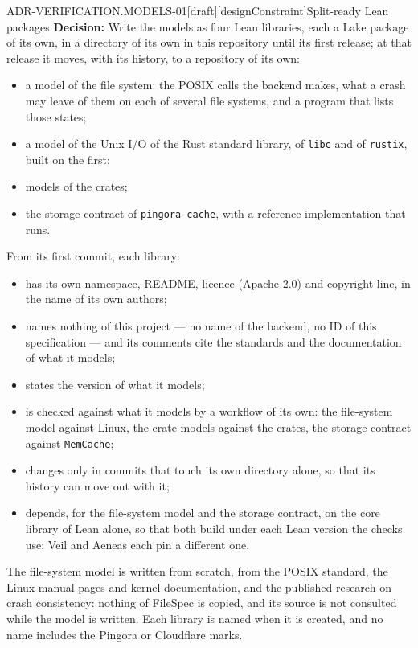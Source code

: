 \begin{requirement}{ADR-VERIFICATION.MODELS-01}[draft][designConstraint]{Split-ready Lean packages}
  \textbf{Decision:} Write the models as four Lean libraries, each a Lake
  package of its own, in a directory of its own in this repository until its
  first release; at that release it moves, with its history, to a repository
  of its own:
  \begin{itemize}
    \item a model of the file system: the POSIX calls the backend makes,
      what a crash may leave of them on each of several file systems, and a
      program that lists those states;
    \item a model of the Unix I/O of the Rust standard library, of
      \texttt{libc} and of \texttt{rustix}, built on the first;
    \item models of the crates;
    \item the storage contract of \texttt{pingora-cache}, with a reference
      implementation that runs.
  \end{itemize}
  From its first commit, each library:
  \begin{itemize}
    \item has its own namespace, README, licence (Apache-2.0) and copyright
      line, in the name of its own authors;
    \item names nothing of this project --- no name of the backend, no ID of
      this specification --- and its comments cite the standards and the
      documentation of what it models;
    \item states the version of what it models;
    \item is checked against what it models by a workflow of its own: the
      file-system model against Linux, the crate models against the crates,
      the storage contract against \texttt{MemCache};
    \item changes only in commits that touch its own directory alone, so that
      its history can move out with it;
    \item depends, for the file-system model and the storage contract, on
      the core library of Lean alone, so that both build under each Lean
      version the checks use: Veil and Aeneas each pin a different one.
  \end{itemize}
  The file-system model is written from scratch, from the POSIX standard,
  the Linux manual pages and kernel documentation, and the published research
  on crash consistency: nothing of FileSpec is copied, and its source is not
  consulted while the model is written. Each library is named when it is
  created, and no name includes the Pingora or Cloudflare marks.


\end{requirement}
